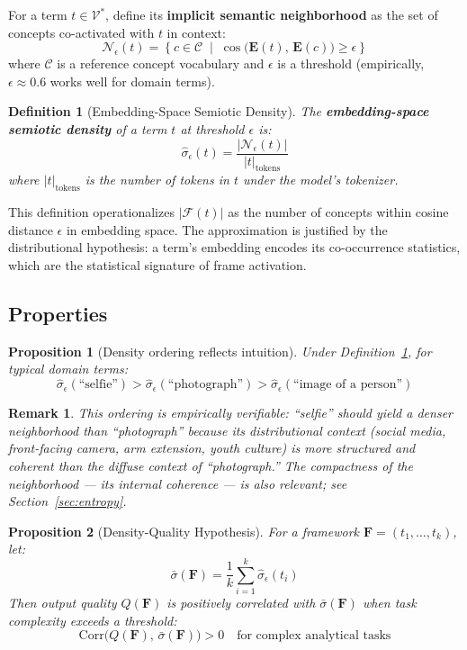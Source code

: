 \documentclass[11pt,a4paper]{article}
\newtheorem{definition}{Definition}[section]
\newtheorem{proposition}{Proposition}[section]
\newtheorem{remark}{Remark}[section]
\begin{document}
For a term $t \in \mathcal{V}^*$, define its \textbf{implicit semantic neighborhood}
as the set of concepts co-activated with $t$ in context:
\[
  \mathcal{N}_\epsilon(t) = \left\{
    c \in \mathcal{C} \;\middle|\;
    \cos\bigl(\mathbf{E}(t),\, \mathbf{E}(c)\bigr) \geq \epsilon
  \right\}
\]
where $\mathcal{C}$ is a reference concept vocabulary and $\epsilon$ is a
threshold (empirically, $\epsilon \approx 0.6$ works well for domain terms).

\begin{definition}[Embedding-Space Semiotic Density]
\label{def:sd-emb}
The \textbf{embedding-space semiotic density} of a term $t$ at threshold
$\epsilon$ is:
\[
  \hat{\sigma}_\epsilon(t)
  = \frac{|\mathcal{N}_\epsilon(t)|}{|t|_{\text{tokens}}}
\]
where $|t|_{\text{tokens}}$ is the number of tokens in $t$ under the model's
tokenizer.
\end{definition}

This definition operationalizes $|\mathcal{F}(t)|$ as the number of concepts
within cosine distance $\epsilon$ in embedding space. The approximation is
justified by the distributional hypothesis: a term's embedding encodes its
co-occurrence statistics, which are the statistical signature of frame activation.

\subsection{Properties}

\begin{proposition}[Density ordering reflects intuition]
\label{prop:ordering}
Under Definition~\ref{def:sd-emb}, for typical domain terms:
\[
  \hat{\sigma}_\epsilon(\text{``selfie''})
  > \hat{\sigma}_\epsilon(\text{``photograph''})
  > \hat{\sigma}_\epsilon(\text{``image of a person''})
\]
\end{proposition}

\begin{remark}
This ordering is empirically verifiable: ``selfie'' should yield a denser
neighborhood than ``photograph'' because its distributional context (social media,
front-facing camera, arm extension, youth culture) is more structured and
coherent than the diffuse context of ``photograph.'' The compactness of the
neighborhood --- its internal coherence --- is also relevant; see
Section~\ref{sec:entropy}.
\end{remark}

\begin{proposition}[Density-Quality Hypothesis]
\label{prop:dq}
For a framework $\mathbf{F} = (t_1, \ldots, t_k)$, let:
\[
  \bar{\sigma}(\mathbf{F}) = \frac{1}{k} \sum_{i=1}^k \hat{\sigma}_\epsilon(t_i)
\]
Then output quality $Q(\mathbf{F})$ is positively correlated with
$\bar{\sigma}(\mathbf{F})$ when task complexity exceeds a threshold:
\[
  \text{Corr}\bigl(Q(\mathbf{F}),\, \bar{\sigma}(\mathbf{F})\bigr) > 0
  \quad \text{for complex analytical tasks}
\]
\end{proposition}
\end{document}
